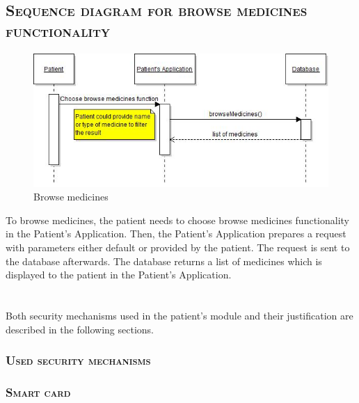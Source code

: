 \section{\textsc{Sequence diagram for browse medicines functionality}}
\begin{figure}[!h]
\includegraphics[width=\linewidth]{patient/browseMedicinesSequenceDiagram}
\caption{Browse medicines}
\end{figure}
To browse medicines, the patient needs to choose browse medicines functionality in the Patient’s Application. 
Then, the Patient’s Application prepares a request with parameters either default or provided by the patient. 
The request is sent to the database afterwards. 
The database returns a list of medicines which is displayed to the patient in the Patient’s Application.
\newpage

\chapter {}

Both security mechanisms used in the patient's module and their justification are described in the following sections.

\subsection{\textsc{Used security mechanisms}}

\subsection{\textsc{Smart card}}

